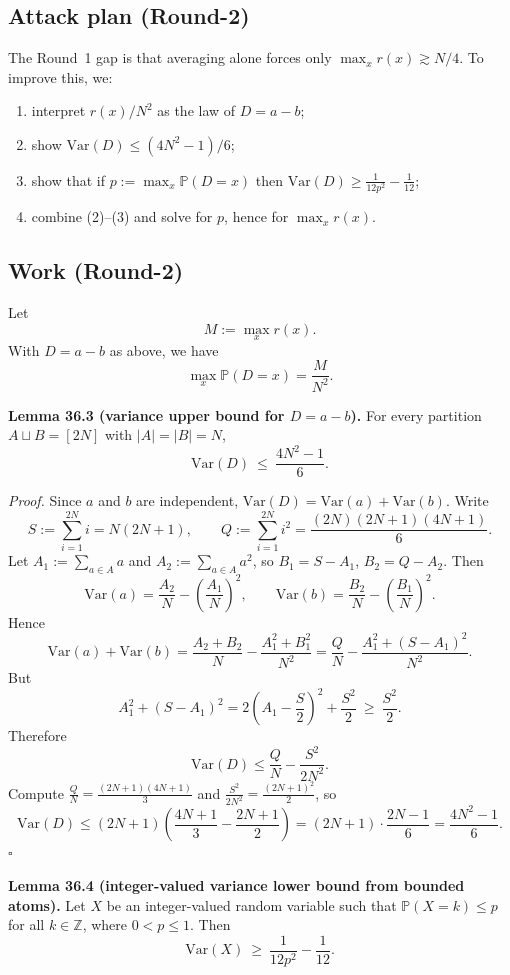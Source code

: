 \subsection{Attack plan (Round-2)}
The Round~1 gap is that averaging alone forces only \(\max_x r(x)\gtrsim N/4\).
To improve this, we:
\begin{enumerate}
\item interpret \(r(x)/N^2\) as the law of \(D=a-b\);
\item show \(\mathrm{Var}(D)\le (4N^2-1)/6\);
\item show that if \(p:=\max_x\mathbb P(D=x)\) then
\(\mathrm{Var}(D)\ge \frac{1}{12p^2}-\frac{1}{12}\);
\item combine (2)--(3) and solve for \(p\), hence for \(\max_x r(x)\).
\end{enumerate}

\subsection{Work (Round-2)}
Let
\[
M:=\max_x r(x).
\]
With \(D=a-b\) as above, we have
\[
\max_x\mathbb P(D=x)=\frac{M}{N^2}.
\]

\medskip
\noindent\textbf{Lemma 36.3 (variance upper bound for \(D=a-b\)).}
For every partition \(A\sqcup B=[2N]\) with \(|A|=|B|=N\),
\[
\mathrm{Var}(D)\ \le\ \frac{4N^2-1}{6}.
\]

\noindent\emph{Proof.}
Since \(a\) and \(b\) are independent,
\(\mathrm{Var}(D)=\mathrm{Var}(a)+\mathrm{Var}(b)\).
Write
\[
S:=\sum_{i=1}^{2N} i = N(2N+1),\qquad
Q:=\sum_{i=1}^{2N} i^2=\frac{(2N)(2N+1)(4N+1)}{6}.
\]
Let
\(A_1:=\sum_{a\in A}a\) and \(A_2:=\sum_{a\in A}a^2\), so
\(B_1=S-A_1\), \(B_2=Q-A_2\).
Then
\[
\mathrm{Var}(a)=\frac{A_2}{N}-\left(\frac{A_1}{N}\right)^2,
\qquad
\mathrm{Var}(b)=\frac{B_2}{N}-\left(\frac{B_1}{N}\right)^2.
\]
Hence
\[
\mathrm{Var}(a)+\mathrm{Var}(b)
=\frac{A_2+B_2}{N}-\frac{A_1^2+B_1^2}{N^2}
=\frac{Q}{N}-\frac{A_1^2+(S-A_1)^2}{N^2}.
\]
But
\[
A_1^2+(S-A_1)^2
=2\left(A_1-\frac{S}{2}\right)^2+\frac{S^2}{2}\ \ge\ \frac{S^2}{2}.
\]
Therefore
\[
\mathrm{Var}(D)\le \frac{Q}{N}-\frac{S^2}{2N^2}.
\]
Compute
\(\frac{Q}{N}=\frac{(2N+1)(4N+1)}{3}\) and
\(\frac{S^2}{2N^2}=\frac{(2N+1)^2}{2}\), so
\[
\mathrm{Var}(D)
\le (2N+1)\left(\frac{4N+1}{3}-\frac{2N+1}{2}\right)
=(2N+1)\cdot\frac{2N-1}{6}
=\frac{4N^2-1}{6}.
\]
\hfill$\square$

\medskip
\noindent\textbf{Lemma 36.4 (integer-valued variance lower bound from bounded atoms).}
Let \(X\) be an integer-valued random variable such that
\(\mathbb P(X=k)\le p\) for all \(k\in\mathbb Z\), where \(0<p\le 1\).
Then
\[
\mathrm{Var}(X)\ \ge\ \frac{1}{12p^2}-\frac{1}{12}.
\]

